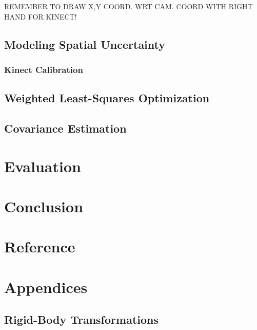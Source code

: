 \documentclass[a4paper]{report}
\numberwithin{figure}{section}
\begin{document}
REMEMBER TO DRAW X,Y COORD. WRT CAM. COORD WITH RIGHT HAND FOR KINECT!

\section{Modeling Spatial Uncertainty} \label{sc_spatial_uncertainty}

\subsection{Kinect Calibration} \label{sb_sc_kinect_calibration}

\section{Weighted Least-Squares Optimization} \label{sc_weighted_lsq}

\section{Covariance Estimation} \label{sc_covariance_estim}

\chapter{Evaluation} \label{cp_evaluation}

\chapter{Conclusion} \label{cp_conc}

\chapter{Reference} \label{cp_ref}


\chapter{Appendices} \label{cp_appendices}

\section{Rigid-Body Transformations} \label{sc_rigid_body_transformations}
\end{document}
